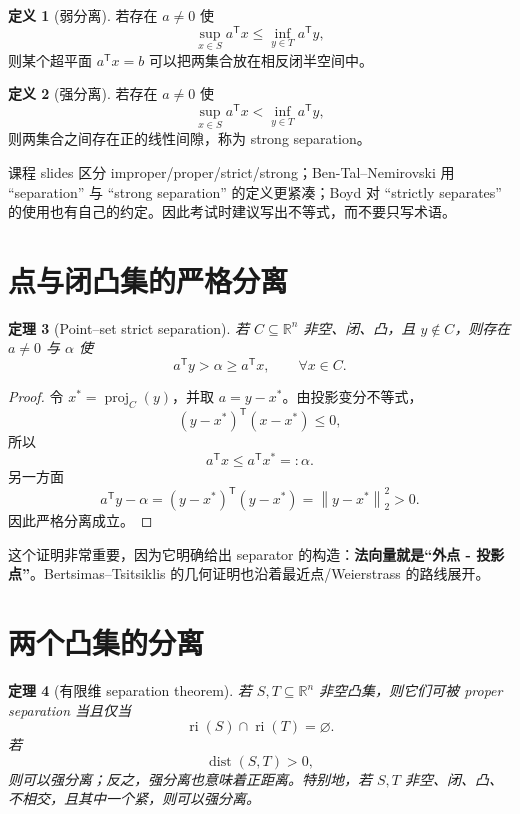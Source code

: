 \documentclass[11pt,a4paper,openany]{ctexrep}
\newtheorem{theorem}{定理}[chapter]
\theoremstyle{definition}
\newtheorem{definition}[theorem]{定义}
\newcommand{\R}{\mathbb{R}}
\newcommand{\ri}{\operatorname{ri}}
\newcommand{\dist}{\operatorname{dist}}
\newcommand{\proj}{\operatorname{proj}}
\newcommand{\norm}[1]{\left\lVert #1\right\rVert}
\newcommand{\transpose}{\mathsf{T}}
\begin{document}
\begin{definition}[弱分离]
若存在 $a\ne0$ 使
\[
\sup_{x\in S}a^\transpose x\le
\inf_{y\in T}a^\transpose y,
\]
则某个超平面 $a^\transpose x=b$ 可以把两集合放在相反闭半空间中。
\end{definition}

\begin{definition}[强分离]
若存在 $a\ne0$ 使
\[
\sup_{x\in S}a^\transpose x<
\inf_{y\in T}a^\transpose y,
\]
则两集合之间存在正的线性间隙，称为 strong separation。
\end{definition}

\begin{warningbox}[术语差异]
课程 slides 区分 improper/proper/strict/strong；Ben-Tal--Nemirovski 用 ``separation'' 与 ``strong separation'' 的定义更紧凑；Boyd 对 ``strictly separates'' 的使用也有自己的约定。因此考试时建议写出不等式，而不要只写术语。
\end{warningbox}

\section{点与闭凸集的严格分离}

\begin{theorem}[Point--set strict separation]
若 $C\subseteq\R^n$ 非空、闭、凸，且 $y\notin C$，则存在 $a\ne0$ 与 $\alpha$ 使
\[
a^\transpose y>\alpha\ge a^\transpose x,
\qquad \forall x\in C.
\]
\end{theorem}

\begin{proof}
令 $x^*=\proj_C(y)$，并取 $a=y-x^*$。由投影变分不等式，
\[
(y-x^*)^\transpose(x-x^*)\le0,
\]
所以
\[
a^\transpose x\le a^\transpose x^*=: \alpha.
\]
另一方面
\[
a^\transpose y-\alpha
=(y-x^*)^\transpose(y-x^*)
=\norm{y-x^*}_2^2>0.
\]
因此严格分离成立。
\end{proof}

这个证明非常重要，因为它明确给出 separator 的构造：\textbf{法向量就是“外点 - 投影点”}。Bertsimas--Tsitsiklis 的几何证明也沿着最近点/Weierstrass 的路线展开。\cite[\S4.7]{bertsimas}\cite[\S2.5, \S8.1]{boyd}

\section{两个凸集的分离}

\begin{theorem}[有限维 separation theorem]
若 $S,T\subseteq\R^n$ 非空凸集，则它们可被 proper separation 当且仅当
\[
\ri(S)\cap\ri(T)=\varnothing.
\]
若
\[
\dist(S,T)>0,
\]
则可以强分离；反之，强分离也意味着正距离。特别地，若 $S,T$ 非空、闭、凸、不相交，且其中一个紧，则可以强分离。\cite[Appendix~B.2.6]{bental}
\end{theorem}
\end{document}
